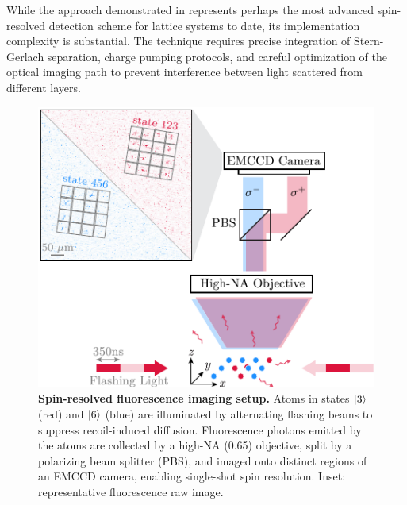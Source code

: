 While the approach demonstrated in \cite{koepsell_robust_2020} represents perhaps the most advanced spin-resolved detection scheme for lattice systems to date, its implementation complexity is substantial. The technique requires precise integration of Stern-Gerlach separation, charge pumping protocols, and careful optimization of the optical imaging path to prevent interference between light scattered from different layers. 






\begin{figure}
    \centering
    \includegraphics{fig-ai/spin-proc.pdf}
    \caption{
	\textbf{Spin-resolved fluorescence imaging setup.} 
	Atoms in states $\left| 3 \right\rangle$ (red) and $\left| 6 \right\rangle$ (blue) are illuminated by alternating flashing beams to suppress recoil-induced diffusion. Fluorescence photons emitted by the atoms are collected by a high-NA (0.65) objective, split by a polarizing beam splitter (PBS), and imaged onto distinct regions of an EMCCD camera, enabling single-shot spin resolution. Inset: representative fluorescence raw image.
	}
    \label{fig:spin-proc}
\end{figure}


